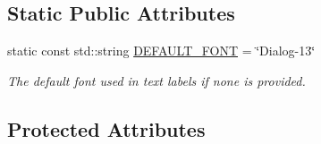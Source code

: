 \subsection*{Static Public Attributes}
\begin{DoxyCompactItemize}
\item 
static const std\+::string \mbox{\hyperlink{classsgl_1_1GText_ab265ee508af32c0c0bb1aa3693977247}{D\+E\+F\+A\+U\+L\+T\+\_\+\+F\+O\+NT}} = \char`\"{}Dialog-\/13\char`\"{}
\begin{DoxyCompactList}\small\item\em The default font used in text labels if none is provided. \end{DoxyCompactList}\end{DoxyCompactItemize}
\subsection*{Protected Attributes}
